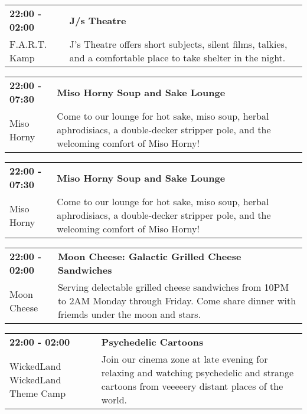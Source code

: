 \begin{tabular}{ p{1in} p{2.2in} }
    \textbf{22:00 - 02:00} & \textbf{J/s Theatre} \\
    F.A.R.T. Kamp \newline  & J's Theatre offers short subjects, silent films, talkies, and a comfortable place to take shelter in the night. \\
    \hline 
\end{tabular}
    
\begin{tabular}{ p{1in} p{2.2in} }
    \textbf{22:00 - 07:30} & \textbf{Miso Horny Soup and Sake Lounge} \\
    Miso Horny \newline  & Come to our lounge for hot sake, miso soup, herbal aphrodisiacs, a double-decker stripper pole, and the welcoming comfort of Miso Horny! \\
    \hline 
\end{tabular}
    
\begin{tabular}{ p{1in} p{2.2in} }
    \textbf{22:00 - 07:30} & \textbf{Miso Horny Soup and Sake Lounge} \\
    Miso Horny \newline  & Come to our lounge for hot sake, miso soup, herbal aphrodisiacs, a double-decker stripper pole, and the welcoming comfort of Miso Horny! \\
    \hline 
\end{tabular}
    
\begin{tabular}{ p{1in} p{2.2in} }
    \textbf{22:00 - 02:00} & \textbf{Moon Cheese: Galactic Grilled Cheese Sandwiches} \\
    Moon Cheese \newline  & Serving delectable grilled cheese sandwiches from 10PM to 2AM Monday through Friday. Come share dinner with friemds under the moon and stars. \\
    \hline 
\end{tabular}
    
\begin{tabular}{ p{1in} p{2.2in} }
    \textbf{22:00 - 02:00} & \textbf{Psychedelic Cartoons} \\
    WickedLand \newline WickedLand Theme Camp & Join our cinema zone at late evening for relaxing and watching psychedelic and strange cartoons from veeeeery distant places of the world. \\
    \hline 
\end{tabular}
    
